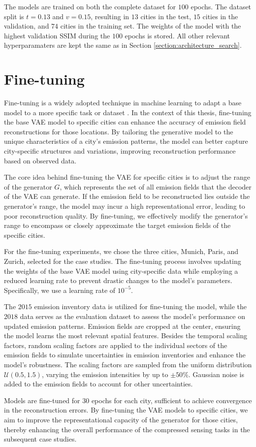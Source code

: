 The models are trained on both the complete dataset for $100$ epochs.
The dataset split is $t = 0.13$ and $v = 0.15$, resulting in $13$ cities in the test, $15$ cities in the validation, and $74$ cities in the training set.
The weights of the model with the highest validation \gls{SSIM} during the $100$ epochs is stored.
All other relevant hyperparamaters are kept the same as in Section \ref{section:architecture_search}.

\section{Fine-tuning}
Fine-tuning is a widely adopted technique in machine learning to adapt a base model to a more specific task or dataset \parencite{FineTuning}.
In the context of this thesis, fine-tuning the base \gls{VAE} model to specific cities can enhance the accuracy of emission field reconstructions for those locations.
By tailoring the generative model to the unique characteristics of a city's emission patterns, the model can better capture city-specific structures and variations, improving reconstruction performance based on observed data.

The core idea behind fine-tuning the \gls{VAE} for specific cities is to adjust the range of the generator $G$, which represents the set of all emission fields that the decoder of the \gls{VAE} can generate.
If the emission field to be reconstructed lies outside the generator's range, the model may incur a high representational error, leading to poor reconstruction quality.
By fine-tuning, we effectively modify the generator's range to encompass or closely approximate the target emission fields of the specific cities.

For the fine-tuning experiments, we chose the three cities, Munich, Paris, and Zurich, selected for the case studies.
The fine-tuning process involves updating the weights of the base \gls{VAE} model using city-specific data while employing a reduced learning rate to prevent drastic changes to the model's parameters.
Specifically, we use a learning rate of $10^{-5}$.

The $2015$ emission inventory data is utilized for fine-tuning the model, while the $2018$ data serves as the evaluation dataset to assess the model's performance on updated emission patterns.
Emission fields are cropped at the center, ensuring the model learns the most relevant spatial features.
Besides the temporal scaling factors, random scaling factors are applied to the individual sectors of the emission fields to simulate uncertainties in emission inventories and enhance the model's robustness.
The scaling factors are sampled from the uniform distribution $\mathcal{U}(0.5, 1.5)$, varying the emission intensities by up to $\pm50\%$.
Gaussian noise is added to the emission fields to account for other uncertainties.

Models are fine-tuned for $30$ epochs for each city, sufficient to achieve convergence in the reconstruction errors.
By fine-tuning the \gls{VAE} models to specific cities, we aim to improve the representational capacity of the generator for those cities, thereby enhancing the overall performance of the compressed sensing tasks in the subsequent case studies.
